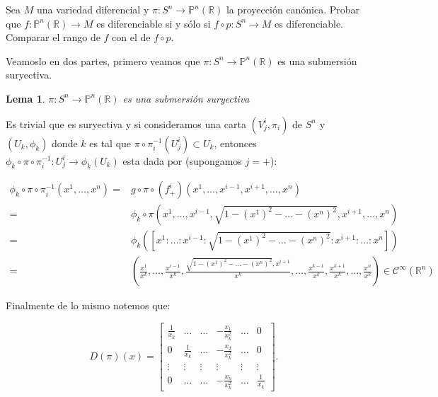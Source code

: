 \documentclass[11pt]{article}
\newcommand{\R}{{\mathbb{R}}}
\numberwithin{theorem}{subsection}
\newtheorem{lemma}[theorem]{Lema}
\newenvironment{proof}[1][Demostraci\'on]{\begin{trivlist}
		\item[\hskip \labelsep {\bfseries #1}]}{\end{trivlist}}
\begin{document}
\begin{question}
	Sea $M$ una variedad diferencial y $\pi:S^n\to\mathbb{P}^n(\R)$ la proyecci\'on can\'onica. Probar que $f:\mathbb{P}^n(\R)\to M$ es diferenciable si y s\'olo si $f\circ p:S^n\to M$ es diferenciable. Comparar el rango de $f$ con el de $f\circ p$.
\end{question}

\begin{solution}
	Veamoslo en dos partes, primero veamos que $\pi: S^n\to\mathbb{P}^n(\R)$ es una submersi\'on suryectiva.
	
	\begin{lemma}
		$\pi:S^n\to\mathbb{P}^n(\R)$ es una submersi\'on suryectiva
	\end{lemma}
	
	\begin{proof}
		Es trivial que es suryectiva y si consideramos una carta $(V^{i}_{j}, \pi_i)$ de $S^n$ y $(U_k, \phi_k)$  donde $k$ es tal que $\pi \circ \pi_i^{-1} (U_{j}^{i}) \subset U_k$, entonces $\phi_k \circ \pi \circ \pi_i^{-1} : U_{j}^{i} \rightarrow \phi_k(U_k)$ esta dada por (supongamos $j = +$):
		
		\begin{equation*}
			\begin{aligned}
				\phi_k \circ \pi \circ \pi_i^{-1}(x^1, \dots , x^n) = & g \circ \pi \circ \left(f^i_+\right) (x^1, \dots, x^{i-1}, x^{i+1} , \dots, x^n) \\ 
				= & \phi_k \circ \pi \left( x^1 , \dots , x^{i-1}, \sqrt{1-(x^{1})^2 - \dots - (x^n)^2}, x^{i+1}, \dots, x^n\right) \\
				= & \phi_k([x^1 : \dots : x^{i-1}: \sqrt{1-(x^{1})^2 - \dots - (x^n)^2}: x^{i+1}: \dots: x^n]) \\
				= & \left( \frac{x^1}{x^k} , \dots , \frac{x^{i-1}}{x^k}, \frac{\sqrt{1-(x^{1})^2 - \dots - (x^n)^2}, x^{i+1}}{x^k}, \dots, \frac{x^{k-1}}{x^k}, \frac{x^{k+1}}{x^k}, \dots , \frac{x^n}{x^k}\right) \in \mathscr{C}^\infty(\R^n)
			\end{aligned}
		\end{equation*}
		
		Finalmente de lo mismo notemos que:
		
		\begin{equation*}
			D(\pi) (x) = \left[\begin{array}{cccccc} \frac{1}{x_k} & \dots & \dots & -\frac{x_1}{x_k^2} & \dots & 0\\
			 0 & \frac{1}{x_k} & \dots & -\frac{x_2}{x_k^2} & \dots & 0\\ \vdots & \vdots & \vdots & \vdots & \vdots & \vdots \\  0 & \dots &  \dots & -\frac{x_n}{x_k^2} & \dots & \frac{1}{x_k}\end{array}\right].
		\end{equation*}
		

\end{proof}
\end{solution}
\end{document}
